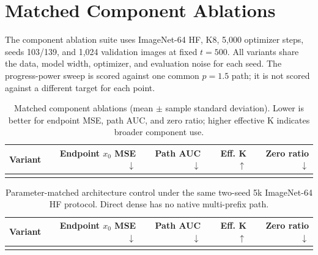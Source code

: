\documentclass[letterpaper]{article}
\begin{document}
\section{Matched Component Ablations}

The component ablation suite uses ImageNet-64 HF, K8, 5,000 optimizer steps,
seeds 103/139, and 1,024 validation images at fixed $t=500$. All variants share
the data, model width, optimizer, and evaluation noise for each seed. The
progress-power sweep is scored against one common $p=1.5$ path; it is not scored
against a different target for each point.

\begin{table}[t]
  \centering
  \small
  \caption{Matched component ablations (mean $\pm$ sample standard deviation).
  Lower is better for endpoint MSE, path AUC, and zero ratio; higher effective K
  indicates broader component use.}
  \label{tab:supp-component-ablation}
  \begin{tabular}{lrrrr}
    \toprule
    Variant & Endpoint $x_0$ MSE $\downarrow$ & Path AUC $\downarrow$ & Eff. K $\uparrow$ & Zero ratio $\downarrow$ \\
    \midrule
    \\
    \bottomrule
  \end{tabular}
\end{table}

\begin{table}[t]
  \centering
  \small
  \caption{Parameter-matched architecture control under the same two-seed 5k
  ImageNet-64 HF protocol. Direct dense has no native multi-prefix path.}
  \label{tab:supp-direct-dense-control}
  \begin{tabular}{lrrrr}
    \toprule
    Variant & Endpoint $x_0$ MSE $\downarrow$ & Path AUC $\downarrow$ & Eff. K $\uparrow$ & Zero ratio $\downarrow$ \\
    \midrule
    \\
    \bottomrule
  \end{tabular}
\end{table}
\end{document}
